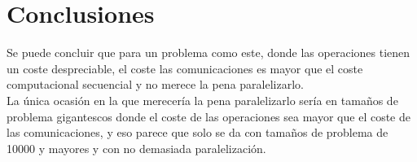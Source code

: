 \newpage \documentclass[a4paper,10pt]{article}
\begin{document}
\section{Conclusiones}

Se puede concluir que para un problema como este, donde las operaciones tienen un coste despreciable, el coste las comunicaciones es mayor que el coste computacional secuencial y no merece la pena paralelizarlo.\\

La única ocasión en la que merecería la pena paralelizarlo sería en tamaños de problema gigantescos donde el coste de las operaciones sea mayor que el coste de las comunicaciones, y eso parece que solo se da con tamaños de problema de 10000 y mayores y con no demasiada paralelización.\\
\end{document}
